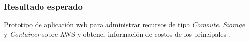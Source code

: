\subsubsection{Resultado esperado}
Prototipo de aplicación web para administrar recursos de tipo \emph{Compute}, \emph{Storage} y \emph{Container} sobre \acrshort{AWS} y obtener información de costos de los principales .

